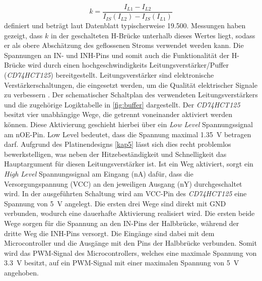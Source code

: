 \begin{equation}
k = \frac{I_{L1}-I_{L2}}{I_{IS}(I_{L2})-I_{IS}(I_{L1})}
\end{equation}\noindent
definiert und beträgt laut Datenblatt typischerweise 19.500. Messungen haben gezeigt, dass $k$ in der geschalteten H-Brücke unterhalb dieses Wertes liegt, sodass er als obere Abschätzung des geflossenen Stroms verwendet werden kann.
Die Spannungen an IN- und INH-Pins und somit auch die Funktionalität der H-Brücke wird durch einen hochgeschwindigkeits Leitungsverstärker/Puffer (\textit{CD74HCT125}) bereitgestellt. Leitungsverstärker sind elektronische Verstärkerschaltungen, die eingesetzt werden, um die Qualität elektrischer Signale zu verbessern \cite{Conrads2014}. Der schematischer Schaltplan des verwendeten Leitungsverstärkers und die zugehörige Logiktabelle in \autoref{fig:buffer} dargestellt. Der \textit{CD74HCT125} besitzt vier unabhängige Wege, die getrennt voneinander aktiviert werden können. Diese Aktivierung geschieht hierbei über ein \textit{Low Level} Spannungssignal am nOE-Pin. Low Level bedeutet, dass die Spannung maximal \SI{1,35}{V} betragen darf. Aufgrund des Platinendesigns \autoref{kap5} lässt sich dies recht problemlos bewerkstelligen, was neben der Hitzebeständigkeit und Schnelligkeit das Hauptargument für diesen Leitungsverstärker ist. Ist ein Weg aktiviert, sorgt ein \textit{High Level} Spannungssignal am Eingang (nA) dafür, dass die Versorgungspannung (VCC) an den jeweiligen Ausgang (nY) durchgeschaltet wird. In der ausgeführten Schaltung wird am VCC-Pin des \textit{CD74HCT125} eine Spannung von \SI{5}{V} angelegt. Die ersten drei Wege sind direkt mit GND verbunden, wodurch eine dauerhafte Aktivierung realisiert wird. Die ersten beide Wege sorgen für die Spannung an den IN-Pins der Halbbrücke, während der dritte Weg die INH-Pins versorgt. Die Eingänge sind dabei mit dem Microcontroller und die Ausgänge mit den Pins der Halbbrücke verbunden. Somit wird das PWM-Signal des Microcontrollers, welches eine maximale Spannung von \SI{3,3}{V} besitzt, auf ein PWM-Signal mit einer maximalen Spannung von \SI{5}{V} angehoben.

